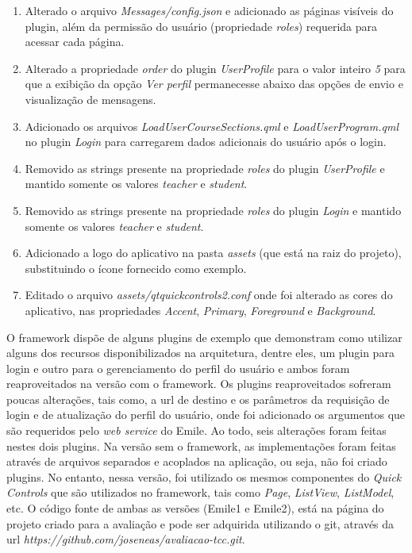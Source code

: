 \begin{enumerate}
	\item Alterado o arquivo \textit{Messages/config.json} e adicionado as páginas visíveis do plugin, além da permissão do usuário (propriedade \textit{roles}) requerida para acessar cada página.

	\item Alterado a propriedade \textit{order} do plugin \textit{UserProfile} para o valor inteiro \textit{5} para que a exibição da opção \textit{Ver perfil} permanecesse abaixo das opções de envio e visualização de mensagens.

	\item Adicionado os arquivos \textit{LoadUserCourseSections.qml} e \textit{LoadUserProgram.qml} no plugin \textit{Login} para carregarem dados adicionais do usuário após o login.

	\item Removido as strings presente na propriedade \textit{roles} do plugin \textit{UserProfile} e mantido somente os valores \textit{teacher} e \textit{student}.

	\item Removido as strings presente na propriedade \textit{roles} do plugin \textit{Login} e mantido somente os valores \textit{teacher} e \textit{student}.

	\item Adicionado a logo do aplicativo na pasta \textit{assets} (que está na raiz do projeto), substituindo o ícone fornecido como exemplo.

	\item Editado o arquivo \textit{assets/qtquickcontrols2.conf} onde foi alterado as cores do aplicativo, nas propriedades \textit{Accent}, \textit{Primary}, \textit{Foreground} e \textit{Background}.
\end{enumerate}

O framework dispõe de alguns plugins de exemplo que demonstram como utilizar alguns dos recursos disponibilizados na arquitetura, dentre eles, um plugin para login e outro para o gerenciamento do perfil do usuário e ambos foram reaproveitados na versão com o framework. Os plugins reaproveitados sofreram poucas alterações, tais como, a url de destino e os parâmetros da requisição de login e de atualização do perfil do usuário, onde foi adicionado os argumentos que são requeridos pelo \textit{web service} do Emile. Ao todo, seis alterações foram feitas nestes dois plugins. Na versão sem o framework, as implementações foram feitas através de arquivos separados e acoplados na aplicação, ou seja, não  foi criado plugins. No entanto, nessa versão, foi utilizado os mesmos componentes do \textit{Quick Controls} que são utilizados no framework, tais como \textit{Page}, \textit{ListView}, \textit{ListModel}, etc. O código fonte de ambas as versões (Emile1 e Emile2), está na página do projeto criado para a avaliação e pode ser adquirida utilizando o git, através da url \textit{https://github.com/joseneas/avaliacao-tcc.git}.\par

